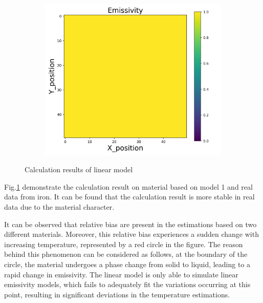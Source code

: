 \begin{figure}[htbp]
\begin{minipage}{\textwidth}
\begin{subfigure}{0.325\textwidth}
        \end{subfigure}
        \begin{subfigure}{0.325\textwidth}
            \centering
            \includegraphics[width=\textwidth]{figures/raw_data/5/linear/emi_cal.jpg}
        \end{subfigure}
    \end{minipage}
    \caption{Calculation results of linear model}
    \label{fig: result_linear_model}
\end{figure}


Fig.\ref{fig: result_linear_model} demonstrate the calculation result on material based on 
model 1 and real data from iron. It can be found that the calculation result is more
stable in real data due to the material character. 


It can be observed that relative bias are present 
in the estimations based on two different materials. Moreover, this relative bias 
experiences a sudden change with increasing temperature, represented by a red 
circle in the figure. The reason behind this phenomenon can be considered as follows, 
at the boundary of the circle, the material undergoes a phase change from solid to liquid, 
leading to a rapid change in emissivity. The linear model is only able to  
simulate linear emissivity models, which fails to adequately fit the variations 
occurring at this point, resulting in significant deviations in the 
temperature estimations.


